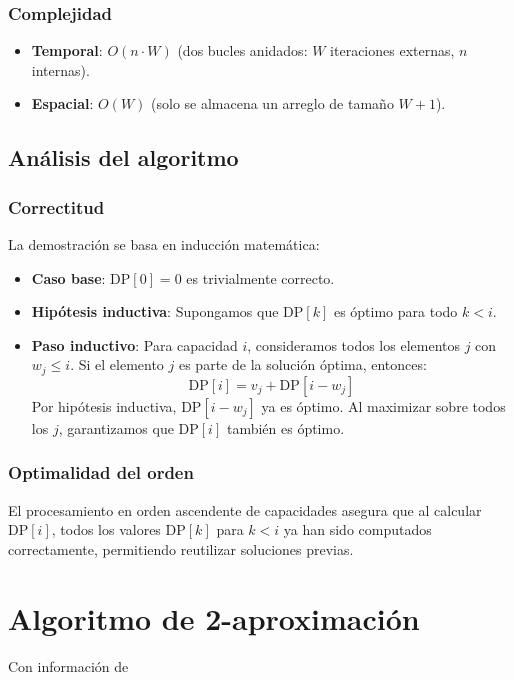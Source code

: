 \documentclass{report}
\begin{document}
\subsubsection*{Complejidad}
\begin{itemize}
    \item \textbf{Temporal}: $O(n \cdot W)$ (dos bucles anidados: $W$ iteraciones externas, $n$ internas).
    \item \textbf{Espacial}: $O(W)$ (solo se almacena un arreglo de tamaño $W+1$).
\end{itemize}

\subsection{Análisis del algoritmo}
\subsubsection*{Correctitud}
La demostración se basa en inducción matemática:

\begin{itemize}
    \item \textbf{Caso base}: $\text{DP}[0] = 0$ es trivialmente correcto.
    
    \item \textbf{Hipótesis inductiva}: Supongamos que $\text{DP}[k]$ es óptimo para todo $k < i$.
    
    \item \textbf{Paso inductivo}: Para capacidad $i$, consideramos todos los elementos $j$ con $w_j \leq i$. Si el elemento $j$ es parte de la solución óptima, entonces:
    \[
    \text{DP}[i] = v_j + \text{DP}[i - w_j]
    \]
    Por hipótesis inductiva, $\text{DP}[i - w_j]$ ya es óptimo. Al maximizar sobre todos los $j$, garantizamos que $\text{DP}[i]$ también es óptimo.
\end{itemize}

\subsubsection*{Optimalidad del orden}
El procesamiento en orden ascendente de capacidades asegura que al calcular $\text{DP}[i]$, todos los valores $\text{DP}[k]$ para $k < i$ ya han sido computados correctamente, permitiendo reutilizar soluciones previas.

\section{Algoritmo de 2-aproximación}
Con información de \cite{Rhee2016}
\end{document}
